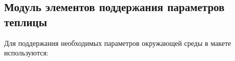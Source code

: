 

\subsection{Модуль элементов поддержания параметров теплицы}

Для поддержания необходимых параметров окружающей среды в макете используются:

